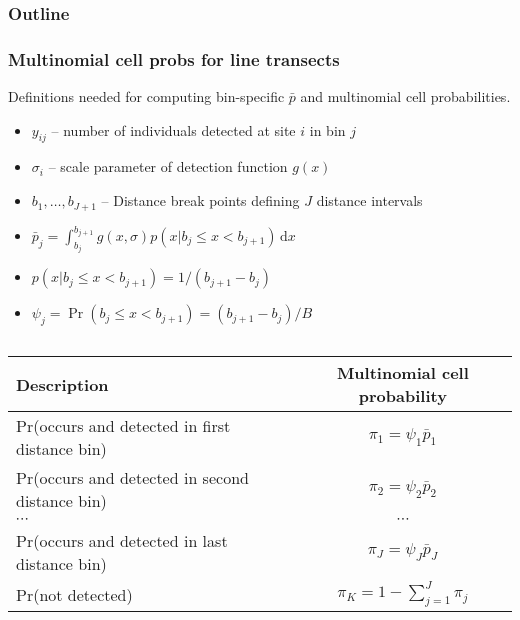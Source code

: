 \documentclass[color=usenames,dvipsnames]{beamer}\usepackage[]{graphicx}\usepackage[]{color}
\begin{document}
\begin{frame}
  \frametitle{Outline}
  \Large
  \tableofcontents[currentsection]
\end{frame}



\begin{frame}
  \frametitle{Multinomial cell probs for line transects}
  \small
  Definitions needed for computing \alert{bin-specific} $\bar{p}$ and
  multinomial cell probabilities. 
  \begin{itemize}
  \small
    \setlength\itemsep{1pt}
    \item $y_{ij}$ -- number of individuals detected at site $i$ in bin $j$
    \item $\sigma_i$ -- scale parameter of detection function $g(x)$
    \item $b_1, \dots, b_{J+1}$ -- Distance break points defining $J$ distance intervals
    \item $\bar{p}_j = \int_{b_j}^{b_{j+1}} g(x,\sigma)p(x|b_j\le x<b_{j+1})\, \mathrm{d}x$
    \item $p(x|b_j\le x<b_{j+1}) = 1/(b_{j+1}-b_j)$
    \item $\psi_j=\Pr(b_j\le x<b_{j+1})=(b_{j+1}-b_j)/B$ %
  \end{itemize}
  \pause \vfill
  \footnotesize
  \begin{columns}
    \column{0.9\paperwidth}
    \begin{tabular}{lc}
      \hline
      \centering
      Description                       & Multinomial cell probability \\
      \hline
      Pr(occurs and detected in first distance bin)  & $\pi_1 = \psi_1\bar{p}_1$   \\
      Pr(occurs and detected in second distance bin)  & $\pi_2 = \psi_2\bar{p}_2$   \\
      {\centering $\cdots$}             & $\cdots$                     \\
      Pr(occurs and detected in last distance bin)  & $\pi_J = \psi_J\bar{p}_J$   \\
      Pr(not detected)                  & $\pi_{K} = 1-\sum_{j=1}^J \pi_j$          \\
      \hline
    \end{tabular}
  \end{columns}
\end{frame}
\end{document}
